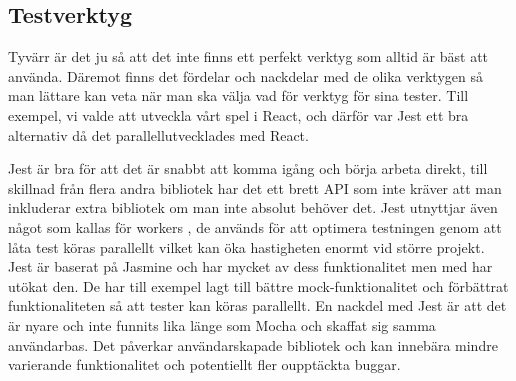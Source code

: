 \subsection{Testverktyg}
Tyvärr är det ju så att det inte finns ett perfekt verktyg som alltid är bäst att använda. Däremot finns det fördelar och nackdelar med de olika verktygen så man lättare kan veta när man ska välja vad för verktyg för sina tester. Till exempel, vi valde att utveckla vårt spel i React, och därför var Jest ett bra alternativ då det parallellutvecklades med React. 

Jest är bra för att det är snabbt att komma igång och börja arbeta direkt, till skillnad från flera andra bibliotek har det ett brett API som inte kräver att man inkluderar extra bibliotek om man inte absolut behöver det. Jest utnyttjar även något som kallas för workers \cite{bib-jest-worker}, de används för att optimera testningen genom att låta test köras parallellt vilket kan öka hastigheten enormt vid större projekt. Jest är baserat på Jasmine och har mycket av dess funktionalitet men med har utökat den. De har till exempel lagt till bättre mock-funktionalitet och förbättrat funktionaliteten så att tester kan köras parallellt. En nackdel med Jest är att det är nyare och inte funnits lika länge som Mocha och skaffat sig samma användarbas. Det påverkar användarskapade bibliotek och kan innebära mindre varierande funktionalitet och potentiellt fler oupptäckta buggar. 